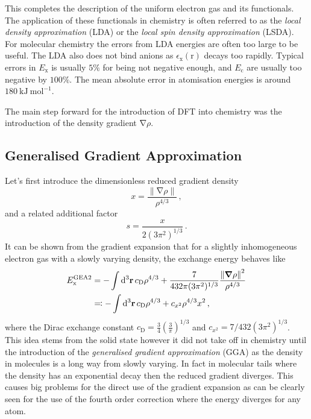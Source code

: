 \documentclass{article}
\theoremstyle{plain}\theoremheaderfont{\normalfont\itshape}\theorembodyfont{\rmfamily}\theoremseparator{.}\newtheorem*{rem}{Remark}\newtheorem*{ex}{Example}\newtheorem*{proof}{Proof}\newtheorem*{altp}{Alternative proof}
\theoremstyle{plain}\theoremheaderfont{\normalfont\bfseries}\theorembodyfont{\rmfamily}\theoremseparator{.}\newtheorem{thm}{Theorem}[section]\newtheorem{lem}[thm]{Lemma}\newtheorem{prop}[thm]{Proposition}\newtheorem*{cor}{Corollary}\newtheorem{defn}[thm]{Definition}\newtheorem{clm}[thm]{Claim}\newtheorem{clminproof}{Claim}
\theoremstyle{break}\theoremheaderfont{\normalfont\itshape}\theorembodyfont{\rmfamily}\theoremseparator{.\medskip}\newtheorem*{proofskip}{Proof}\newtheorem*{exs}{Examples}\newtheorem*{rems}{Remarks}
\theoremstyle{break}\theoremheaderfont{\normalfont\bfseries}\theorembodyfont{\rmfamily}\theoremseparator{.\medskip}\newtheorem{lemskip}[thm]{Lemma}\newtheorem{defnskip}[thm]{Definition}\newtheorem{propskip}[thm]{Proposition}\newtheorem{thmskip}[thm]{Theorem}
\numberwithin{equation}{section}
\newcommand{\unit}[1]{\ \mathrm{#1}}
\newcommand{\dd}[2][]{\mathrm{d}^{#1} #2\,}
\newcommand{\vb}[1]{\bm{\mathrm{#1}}}
\newcommand{\norm}[1]{\left\| #1 \right\|}
\newcommand{\grad}{\vb{\nabla}}
\newcommand{\x}{_{\text{x}}}
\newcommand{\corr}{_{\text{c}}}
\begin{document}
    This completes the description of the uniform electron gas and its functionals. The application of these functionals in chemistry is often referred to as the \textit{local density approximation} (LDA) or the \textit{local spin density approximation} (LSDA). For molecular chemistry the errors from LDA energies are often too large to be useful. The LDA also does not bind anions as \(\epsilon\x(\vb{r})\) decays too rapidly. Typical errors in \(E\x\) is usually \(5\%\) for being not negative enough, and \(E\corr\) are usually too negative by \(100\%\). The mean absolute error in atomisation energies is around \(180\unit{kJ}\unit{mol}^{-1}\).

    The main step forward for the introduction of DFT into chemistry was the introduction of the density gradient \(\grad\rho\).

    \subsection{Generalised Gradient Approximation}
    Let's first introduce the dimensionless reduced gradient density
    \begin{equation}
        x=\frac{\norm{\grad\rho}}{\rho^{4/3}}\,,
    \end{equation}
    and a related additional factor
    \begin{equation}
        s=\frac{x}{2(3\pi^2)^{1/3}}\,.
    \end{equation}
    It can be shown from the gradient expansion that for a slightly inhomogeneous electron gas with a slowly varying density, the exchange energy behaves like
    \begin{align}
        E\x^{\text{GEA2}}&=-\int\dd[3]{\vb{r}} c_{\text{D}}\rho^{4/3}+\frac{7}{432\pi(3\pi^2)^{1/3}}\frac{\norm{\grad\rho}^2}{\rho^{4/3}}\notag\\
        &\eqqcolon-\int\dd[3]{\vb{r}}c_{\text{D}}\rho^{4/3}+c_{x^2}\rho^{4/3}x^2\,,
    \end{align}
    where the Dirac exchange constant \(c_{\text{D}}=\frac{3}{4}(\frac{3}{\pi})^{1/3}\) and \(c_{x^2}=7/432(3\pi^2)^{1/3}\). This idea stems from the solid state however it did not take off in chemistry until the introduction of the \textit{generalised gradient approximation} (GGA) as the density in molecules is a long way from slowly varying. In fact in molecular tails where the density has an exponential decay then the reduced gradient diverges. This causes big problems for the direct use of the gradient expansion as can be clearly seen for the use of the fourth order correction where the energy diverges for any atom.
\end{document}
